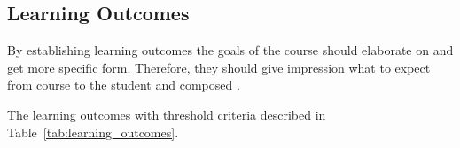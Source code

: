 \subsection{Learning Outcomes}

By establishing learning outcomes the goals of the course should elaborate on and get more specific form. Therefore, they should give impression what to expect from course to the student and composed  \citep[p.~7]{OppeArenduskeskus2010}.

The learning outcomes with threshold criteria described in Table~\ref{tab:learning_outcomes}.



